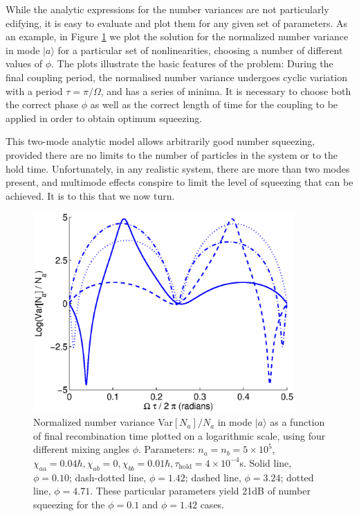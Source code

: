\documentclass{iopart}
\begin{document}

While the analytic expressions for the number variances are not particularly edifying, it is easy to evaluate and plot them for any given set of parameters. As an example, in Figure \ref{figTwoModeAnalyticExamples} we plot the solution for the normalized number variance in mode $|a\rangle$ for a particular set of nonlinearities, choosing a number of different values of $\phi$. The plots illustrate the basic features of the problem: During the final coupling period, the normalised number variance undergoes cyclic variation with a period $\tau=\pi / \Omega$, and has a series of minima. It is necessary to choose both the correct phase $\phi$ as well as the correct length of time for the coupling to be applied in order to obtain optimum squeezing.

This two-mode analytic model allows arbitrarily good number squeezing, provided there are no limits to the number of particles in the system or to the hold time. Unfortunately, in any realistic system, there are more than two modes present, and multimode effects conspire to limit the level of squeezing that can be achieved. It is to this that we now turn.

\begin{figure}
    \centering
    \includegraphics[width=10cm]{figures/analytic_two_mode_examples.eps}
    \caption{Normalized number variance Var$[N_a]/N_a$ in mode $|a \rangle$ as a function of final recombination time plotted on a logarithmic scale, using four different mixing angles $\phi$. Parameters: $n_a = n_b =5 \times 10^5$, $\chi_{aa}=0.04 \hbar, \chi_{ab}=0, \chi_{bb}=0.01\hbar, \tau_{\mathrm{hold}}=4\times 10^{-4}$s. Solid line, $\phi=0.10$; dash-dotted line, $\phi=1.42$; dashed line, $\phi=3.24$; dotted line, $\phi=4.71$. These particular parameters yield 21dB of number squeezing for the $\phi=0.1$ and $\phi=1.42$ cases.} 
    \label{figTwoModeAnalyticExamples}
\end{figure}
\end{document}
